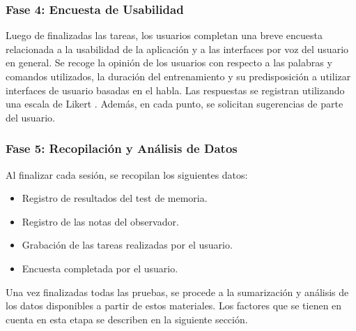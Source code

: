 \subsubsection{Fase 4: Encuesta de Usabilidad}
Luego de finalizadas las tareas, los usuarios completan una breve encuesta relacionada a la usabilidad de
la aplicaci\'on y a las interfaces por voz del usuario en general.
Se recoge la opini\'on de los usuarios con respecto a las palabras y comandos utilizados, la duraci\'on del
entrenamiento y su predisposici\'on a utilizar interfaces de usuario basadas en el habla. Las respuestas se
registran utilizando una escala de Likert \cite{Allen:2007}.
Adem\'as, en cada punto, se solicitan sugerencias de parte del usuario. 	

\subsubsection{Fase 5: Recopilaci\'on y An\'alisis de Datos} 
Al finalizar cada sesi\'on, se recopilan los siguientes datos:
	\begin{itemize}			
		\item Registro de resultados del test de memoria.
		\item Registro de las notas del observador.
		\item Grabaci\'on de las tareas realizadas por el usuario.
		\item Encuesta completada por el usuario.
	\end{itemize}

Una vez finalizadas todas las pruebas, se procede a la sumarizaci\'on y an\'alisis de los datos disponibles
a partir de estos materiales. Los factores que se tienen en cuenta en esta etapa se describen en la
siguiente secci\'on.

